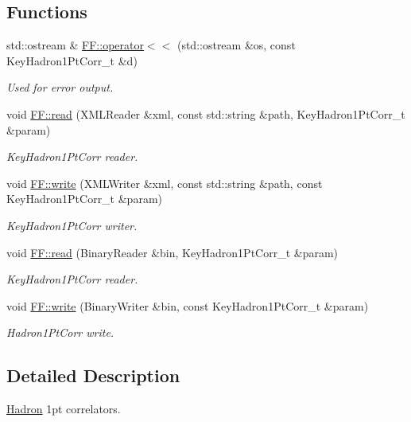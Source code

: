 \subsection*{Functions}
\begin{DoxyCompactItemize}
\item 
std\+::ostream \& \mbox{\hyperlink{namespaceFF_aa86be255f897379f638160fcf2504397}{F\+F\+::operator$<$$<$}} (std\+::ostream \&os, const Key\+Hadron1\+Pt\+Corr\+\_\+t \&d)
\begin{DoxyCompactList}\small\item\em Used for error output. \end{DoxyCompactList}\item 
void \mbox{\hyperlink{namespaceFF_acb4db5dbe27937736b4f2cbed9694c56}{F\+F\+::read}} (X\+M\+L\+Reader \&xml, const std\+::string \&path, Key\+Hadron1\+Pt\+Corr\+\_\+t \&param)
\begin{DoxyCompactList}\small\item\em Key\+Hadron1\+Pt\+Corr reader. \end{DoxyCompactList}\item 
void \mbox{\hyperlink{namespaceFF_ab36d46cd7c78477e7dcc2679d6cadd26}{F\+F\+::write}} (X\+M\+L\+Writer \&xml, const std\+::string \&path, const Key\+Hadron1\+Pt\+Corr\+\_\+t \&param)
\begin{DoxyCompactList}\small\item\em Key\+Hadron1\+Pt\+Corr writer. \end{DoxyCompactList}\item 
void \mbox{\hyperlink{namespaceFF_a09293bf4dc7954334e338c256b1efc75}{F\+F\+::read}} (Binary\+Reader \&bin, Key\+Hadron1\+Pt\+Corr\+\_\+t \&param)
\begin{DoxyCompactList}\small\item\em Key\+Hadron1\+Pt\+Corr reader. \end{DoxyCompactList}\item 
void \mbox{\hyperlink{namespaceFF_a78fdf587c961ada1987ee8f443e3d961}{F\+F\+::write}} (Binary\+Writer \&bin, const Key\+Hadron1\+Pt\+Corr\+\_\+t \&param)
\begin{DoxyCompactList}\small\item\em Hadron1\+Pt\+Corr write. \end{DoxyCompactList}\end{DoxyCompactItemize}


\subsection{Detailed Description}
\mbox{\hyperlink{namespaceHadron}{Hadron}} 1pt correlators. 

